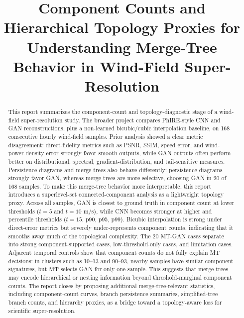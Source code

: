 \documentclass[conference]{IEEEtran}
\begin{document}
\title{Component Counts and Hierarchical Topology Proxies for Understanding Merge-Tree Behavior in Wind-Field Super-Resolution}

\author{%
}

\maketitle

\begin{abstract}
This report summarizes the component-count and topology-diagnostic stage of a wind-field super-resolution study. The broader project compares PhIRE-style CNN and GAN reconstructions, plus a non-learned bicubic/cubic interpolation baseline, on 168 consecutive hourly wind-field samples. Prior analysis showed a clear metric disagreement: direct-fidelity metrics such as PSNR, SSIM, speed error, and wind-power-density error strongly favor smooth outputs, while GAN outputs often perform better on distributional, spectral, gradient-distribution, and tail-sensitive measures. Persistence diagrams and merge trees also behave differently: persistence diagrams strongly favor GAN, whereas merge trees are more selective, choosing GAN in 20 of 168 samples. To make this merge-tree behavior more interpretable, this report introduces a superlevel-set connected-component analysis as a lightweight topology proxy. Across all samples, GAN is closest to ground truth in component count at lower thresholds ($t=5$ and $t=10$ m/s), while CNN becomes stronger at higher and percentile thresholds ($t=15$, p90, p95, p99). Bicubic interpolation is strong under direct-error metrics but severely under-represents component counts, indicating that it smooths away much of the topological complexity. The 20 MT-GAN cases separate into strong component-supported cases, low-threshold-only cases, and limitation cases. Adjacent temporal controls show that component counts do not fully explain MT decisions: in clusters such as 10--13 and 90--93, nearby samples have similar component signatures, but MT selects GAN for only one sample. This suggests that merge trees may encode hierarchical or nesting information beyond threshold-marginal component counts. The report closes by proposing additional merge-tree-relevant statistics, including component-count curves, branch persistence summaries, simplified-tree branch counts, and hierarchy proxies, as a bridge toward a topology-aware loss for scientific super-resolution.
\end{abstract}
\end{document}
